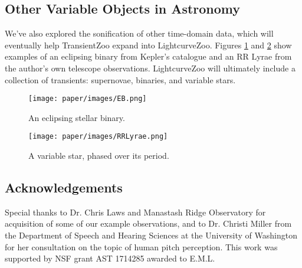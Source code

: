\documentclass[]{acmsiggraph}
\begin{document}

\subsection{Other Variable Objects in Astronomy}

We’ve also explored the sonification of other time-domain data, which will eventually help TransientZoo expand into LightcurveZoo. Figures \ref{fig:EB} and \ref{fig:RRLyrae} show examples of an eclipsing binary from Kepler’s catalogue and an RR Lyrae from the author's own telescope observations. LightcurveZoo will ultimately include a collection of transients: supernovae, binaries, and variable stars.

\begin{figure}
\centering
\texttt{[image: paper/images/EB.png]}
\caption{An eclipsing stellar binary.}
\label{fig:EB}
\end{figure}

\begin{figure}
\centering
\texttt{[image: paper/images/RRLyrae.png]}
\caption{A variable star, phased over its period.}
\label{fig:RRLyrae}
\end{figure}

\subsection{Acknowledgements}
Special thanks to Dr. Chris Laws and Manastash Ridge Observatory for acquisition of some of our example observations, and to Dr. Christi Miller from the Department of Speech and Hearing Sciences at the University of Washington for her consultation on the topic of human pitch perception. This work was supported by NSF grant AST 1714285 awarded to E.M.L.
\end{document}
